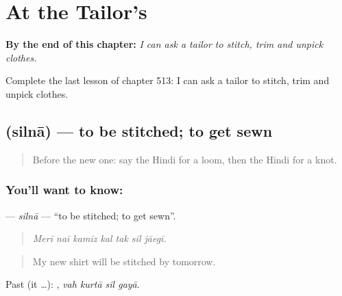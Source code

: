 
\chapter{At the Tailor's}
\label{ch:hi-at-the-tailor-s}

\begin{chapteropening}
\textbf{By the end of this chapter:} \emph{I can ask a tailor to stitch, trim and unpick clothes.}

Complete the last lesson of chapter 513: I can ask a tailor to stitch, trim and unpick clothes.
\end{chapteropening}

\section[\texorpdfstring{\hi{सिलना} (silnā)}{सिलना (silnā)}]{ (silnā) — to be stitched; to get sewn}

\label{lesson:HI-C513-silna}



\begin{quote}
Before the new one: say the Hindi for a loom, then the Hindi for a knot.
\end{quote}

\subsection*{You'll want to know: }
\textbf{} — \emph{silnā} — \textquotedblleft{}to be stitched; to get sewn\textquotedblright{}.

\begin{quote}
      
\end{quote}

\begin{quote}
\emph{Merī naī kamīz kal tak sil jāegī.}
\end{quote}

\begin{quote}
My new shirt will be stitched by tomorrow.
\end{quote}

Past (it …):    , \emph{vah kurtā sil gayā}.

